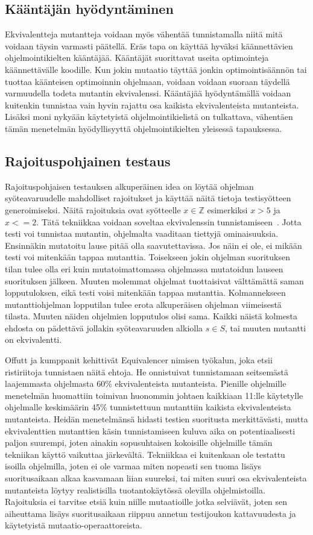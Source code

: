 \documentclass[finnish]{tktltiki2}
\begin{document}
\subsection{Kääntäjän hyödyntäminen}
Ekvivalentteja mutantteja voidaan myös vähentää tunnistamalla niitä mitä voidaan täysin varmasti päätellä. Eräs tapa on käyttää hyväksi käännettävien ohjelmointikielten kääntäjää. Kääntäjät suorittavat useita optimointeja käännettävälle koodille. Kun jokin mutaatio täyttää jonkin optimointisäännön tai tuottaa käänteisen optimoinnin ohjelmaan, voidaan voidaan suoraan täydellä varmuudella todeta mutantin ekvivalenssi. Kääntäjää hyödyntämällä voidaan kuitenkin tunnistaa vain hyvin rajattu osa kaikista ekvivalenteista mutanteista. Lisäksi moni nykyään käytetyistä ohjelmointikielistä on tulkattava, vähentäen tämän menetelmän hyödyllisyyttä ohjelmointikielten yleisessä tapauksessa.

\subsection{Rajoituspohjainen testaus}
Rajoituspohjaisen testauksen alkuperäinen idea on löytää ohjelman syöteavaruudelle mahdolliset rajoitukset ja käyttää näitä tietoja testisyötteen generoimiseksi. Näitä rajoituksia ovat syötteelle $x \in \mathbb{Z}$ esimerkiksi $x > 5$ ja $x <= 2$. Tätä tekniikkaa voidaan soveltaa ekvivalenssin tunnistamiseen~\cite{OffuttP96}. Jotta testi voi tunnistaa mutantin, ohjelmalta vaaditaan tiettyjä ominaisuuksia. Ensinnäkin mutatoitu lause pitää olla saavutettavissa. Jos näin ei ole, ei mikään testi voi mitenkään tappaa mutanttia. Toisekseen jokin ohjelman suorituksen tilan tulee olla eri kuin mutatoimattomassa ohjelmassa mutatoidun lauseen suorituksen jälkeen. Muuten molemmat ohjelmat tuottaisivat välttämättä saman lopputuloksen, eikä testi voisi mitenkään tappaa mutanttia. Kolmannekseen mutanttiohjelman lopputilan tulee erota alkuperäisen ohjelman viimeisestä tilasta. Muuten näiden ohjelmien lopputulos olisi sama. Kaikki näistä kolmesta ehdosta on pädettävä jollakin syöteavaruuden alkiolla $s \in S$, tai muuten mutantti on ekvivalentti. 

Offutt ja kumppanit kehittivät Equivalencer nimisen työkalun, joka etsii ristiriitoja tunnistaen näitä ehtoja. He onnistuivat tunnistamaan seitsemästä laajemmasta ohjelmasta 60\% ekvivalenteista mutanteista. Pienille ohjelmille menetelmän huomattiin toimivan huonommin johtaen kaikkiaan 11:lle käytetylle ohjelmalle keskimäärin 45\% tunnistettuun mutanttiin kaikista ekvivalenteista mutanteista. Heidän menetelmänsä hidasti testien suoritusta merkittävästi, mutta ekvivalenttien mutanttien käsin tunnistamiseen kuluva aika on potentiaalisesti paljon suurempi, joten ainakin sopusuhtaisen kokoisille ohjelmille tämän tekniikan käyttö vaikuttaa järkevältä. Tekniikkaa ei kuitenkaan ole testattu isoilla ohjelmilla, joten ei ole varmaa miten nopeasti sen tuoma lisäys suoritusaikaan alkaa kasvamaan liian suureksi, tai miten suuri osa ekvivalenteista mutanteista löytyy realistisilla tuotantokäytössä olevilla ohjelmistoilla. Rajoituksia ei tarvitse etsiä kuin niille mutaatioille jotka selviävät, joten sen aiheuttama lisäys suoritusaikaan riippuu annetun testijoukon kattavuudesta ja käytetyistä mutaatio-operaattoreista.
\end{document}
